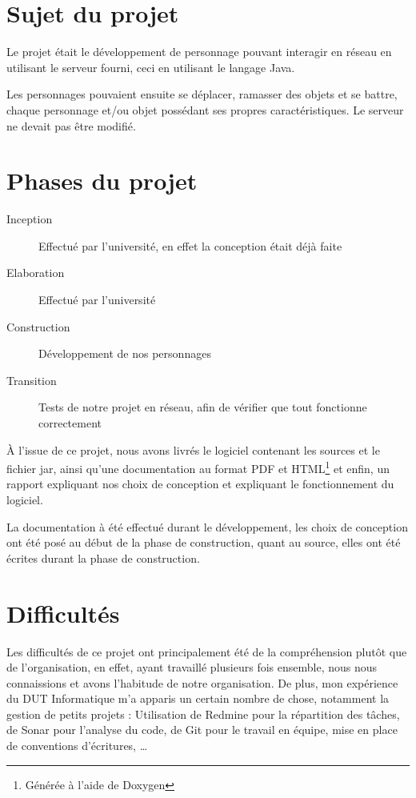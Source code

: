 \documentclass[a4paper, 11pt]{article}
\begin{document}
	\maketitle
	\section{Sujet du projet}
	Le projet était le développement de personnage pouvant interagir en réseau en utilisant le serveur fourni, ceci en utilisant le langage Java.

	Les personnages pouvaient ensuite se déplacer, ramasser des objets et se battre, chaque personnage et/ou objet possédant ses propres caractéristiques. Le
	serveur ne devait pas être modifié.
	\section{Phases du projet}
	\begin{description}
		\item[Inception] Effectué par l'université, en effet la conception était déjà faite
		\item[Elaboration] Effectué par l'université
		\item[Construction] Développement de nos personnages
		\item[Transition] Tests de notre projet en réseau, afin de vérifier que tout fonctionne correctement
	\end{description}

	À l'issue de ce projet, nous avons livrés le logiciel contenant les sources et le fichier jar, ainsi qu'une documentation au format PDF et
	HTML\footnote{Générée à l'aide de Doxygen} et enfin, un rapport expliquant nos choix de conception et expliquant le fonctionnement du logiciel.

	La documentation à été effectué durant le développement, les choix de conception ont été posé au début de la phase de construction, quant au source, elles
	ont été écrites durant la phase de construction.
	\section{Difficultés}
	Les difficultés de ce projet ont principalement été de la compréhension plutôt que de l'organisation, en effet, ayant travaillé plusieurs fois ensemble, nous
	nous connaissions et avons l'habitude de notre organisation. De plus, mon expérience du DUT Informatique m'a apparis un certain nombre de chose, notamment
	la gestion de petits projets : Utilisation de Redmine pour la répartition des tâches, de Sonar pour l'analyse du code, de Git pour le travail en équipe, mise
	en place de conventions d'écritures, \ldots
\end{document}
